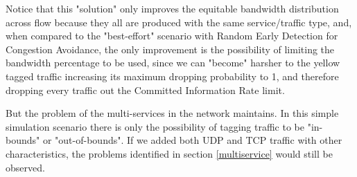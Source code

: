 \documentclass[conference,compsoc]{IEEEtran}
\begin{document}
     Notice that this "solution" only improves the equitable bandwidth distribution across flow because they all are produced with the same service/traffic type, and, when compared to the "best-effort" scenario with Random Early Detection for Congestion Avoidance, the only improvement is the possibility of limiting the bandwidth percentage to be used, since we can "become" harsher to the yellow tagged traffic increasing its maximum dropping probability to 1, and therefore dropping every traffic out the Committed Information Rate limit. \par
     But the problem of the multi-services in the network maintains. In this simple simulation scenario there is only the possibility of tagging traffic to be "in-bounds" or "out-of-bounds". If we added both UDP and TCP traffic with other characteristics, the problems identified in section \ref{multiservice} would still be observed.
     
     
\end{document}
